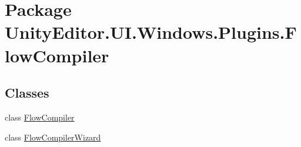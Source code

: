 \hypertarget{namespace_unity_editor_1_1_u_i_1_1_windows_1_1_plugins_1_1_flow_compiler}{}\section{Package Unity\+Editor.\+U\+I.\+Windows.\+Plugins.\+Flow\+Compiler}
\label{namespace_unity_editor_1_1_u_i_1_1_windows_1_1_plugins_1_1_flow_compiler}
\subsection*{Classes}
\begin{DoxyCompactItemize}
\item 
class \hyperlink{class_unity_editor_1_1_u_i_1_1_windows_1_1_plugins_1_1_flow_compiler_1_1_flow_compiler}{Flow\+Compiler}
\item 
class \hyperlink{class_unity_editor_1_1_u_i_1_1_windows_1_1_plugins_1_1_flow_compiler_1_1_flow_compiler_wizard}{Flow\+Compiler\+Wizard}
\end{DoxyCompactItemize}

